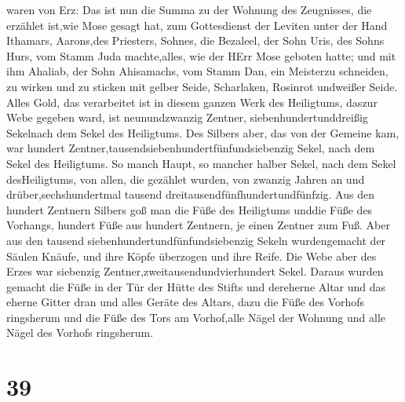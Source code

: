 waren von Erz:  Das ist nun die Summa zu der Wohnung des
Zeugnisses, die erzählet ist,wie Mose gesagt hat, zum Gottesdienst der
Leviten unter der Hand Ithamars, Aarons,des Priesters, Sohnes,
 die Bezaleel, der Sohn Uris, des Sohns Hurs, vom Stamm
Juda machte,alles, wie der HErr Mose geboten hatte;  und
mit ihm Ahaliab, der Sohn Ahisamachs, vom Stamm Dan, ein Meisterzu
schneiden, zu wirken und zu sticken mit gelber Seide, Scharlaken,
Rosinrot undweißer Seide.  Alles Gold, das verarbeitet ist
in diesem ganzen Werk des Heiligtums, daszur Webe gegeben ward, ist
neunundzwanzig Zentner, siebenhundertunddreißig Sekelnach dem Sekel des
Heiligtums.  Des Silbers aber, das von der Gemeine kam, war
hundert Zentner,tausendsiebenhundertfünfundsiebenzig Sekel, nach dem
Sekel des Heiligtums.  So manch Haupt, so mancher halber
Sekel, nach dem Sekel desHeiligtums, von allen, die gezählet wurden, von
zwanzig Jahren an und drüber,sechshundertmal tausend
dreitausendfünfhundertundfünfzig.  Aus den hundert Zentnern
Silbers goß man die Füße des Heiligtums unddie Füße des Vorhangs,
hundert Füße aus hundert Zentnern, je einen Zentner zum Fuß.
 Aber aus den tausend siebenhundertundfünfundsiebenzig
Sekeln wurdengemacht der Säulen Knäufe, und ihre Köpfe überzogen und
ihre Reife.  Die Webe aber des Erzes war siebenzig
Zentner,zweitausendundvierhundert Sekel.  Daraus wurden
gemacht die Füße in der Tür der Hütte des Stifts und dereherne Altar und
das eherne Gitter dran und alles Geräte des Altars,  dazu
die Füße des Vorhofs ringsherum und die Füße des Tors am Vorhof,alle
Nägel der Wohnung und alle Nägel des Vorhofs ringsherum.

\hypertarget{section-38}{%
\section{39}\label{section-38}}

